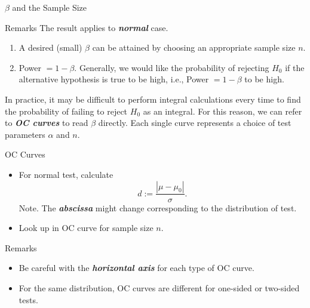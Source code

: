 \documentclass{beamer}
\newcommand{\bb}[1]{\textcolor{antiquefuchsia}{\textbf{\textit{#1}}}}
\begin{document}
\begin{frame}{$\beta$ and the Sample Size}
\begin{block}{Remarks}
The result applies to \bb{normal} case.
\begin{enumerate}
\item A desired (small) $\beta$ can be attained by choosing an appropriate sample size $n$.
\item Power $=1-\beta$. Generally, we would like the probability of rejecting $H_{0}$ if the alternative hypothesis is true to be high, i.e., Power $=1-\beta$ to be high.
\end{enumerate}
\end{block}
In practice, it may be difficult to perform integral calculations every time to find the probability of failing to reject $H_{0}$ as an integral. For this reason, we can refer to \bb{OC curves} to read $\beta$ directly. Each single curve represents a choice of test parameters $\alpha$ and $n$.
\end{frame}

\begin{frame}{OC Curves}
\begin{itemize}
\item For normal test, calculate
$$
d:=\frac{\left|\mu-\mu_{0}\right|}{\sigma} .
$$
Note. The \bb{abscissa} might change corresponding to the distribution of test.\item Look up in OC curve for sample size $n$.
\end{itemize}
\begin{block}{Remarks}
\begin{itemize}
\item Be careful with the \bb{horizontal axis} for each type of OC curve.
\item For the same distribution, OC curves are different for one-sided or two-sided tests.
\end{itemize}
\end{block}
\end{frame}
\end{document}
